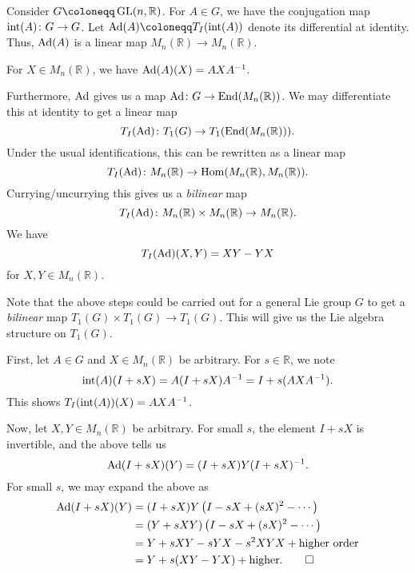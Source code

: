 \documentclass[12pt]{article}
\begin{document}
\begin{thm}
	Consider $G \coloneqq \GL(n, \mathbb{R})$. 
	For $A \in G$, we have the conjugation map $\operatorname{int}(A) \colon G \to G$. 
	Let $\Ad(A) \coloneqq T_{I}(\Int(A))$ denote its differential at identity. Thus, $\operatorname{Ad}(A)$ is a linear map $M_{n}(\mathbb{R}) \to M_{n}(\mathbb{R})$.

	For $X \in M_{n}(\mathbb{R})$, we have $\operatorname{Ad}(A)(X) = AXA^{-1}$.

	Furthermore, $\operatorname{Ad}$ gives us a map $\operatorname{Ad} \colon G \to \operatorname{End}(M_{n}(\mathbb{R}))$. We may differentiate this at identity to get a linear map
	\begin{equation*} 
		T_{I}(\operatorname{Ad}) \colon T_{1}(G) \to T_{1}(\operatorname{End}(M_{n}(\mathbb{R}))).
	\end{equation*}
	Under the usual identifications, this can be rewritten as a linear map
	\begin{equation*} 
		T_{I}(\operatorname{Ad}) \colon M_{n}(\mathbb{R}) \to \operatorname{Hom}(M_{n}(\mathbb{R}), M_{n}(\mathbb{R})).
	\end{equation*}
	Currying/uncurrying this gives us a \emph{bilinear} map
	\begin{equation*} 
		T_{I}(\operatorname{Ad}) \colon M_{n}(\mathbb{R}) \times M_{n}(\mathbb{R}) \to M_{n}(\mathbb{R}).
	\end{equation*}
	We have
	\begin{equation*} 
		T_{I}(\operatorname{Ad})(X, Y) = XY - YX
	\end{equation*}
	for $X, Y \in M_{n}(\mathbb{R})$.
\end{thm}
Note that the above steps could be carried out for a general Lie group $G$ to get a \emph{bilinear} map $T_{1}(G) \times T_{1}(G) \to T_{1}(G)$. 
This will give us the Lie algebra structure on $T_{1}(G)$.
\begin{sketch}
	First, let $A \in G$ and $X \in M_{n}(\mathbb{R})$ be arbitrary. 
	For $s \in \mathbb{R}$, we note
	\begin{equation*} 
		\operatorname{int}(A)(I + sX) = A(I + sX)A^{-1} = I + s(AXA^{-1}).
	\end{equation*}
	This shows $T_{I}(\operatorname{int}(A))(X) = AXA^{-1}$.

	Now, let $X, Y \in M_{n}(\mathbb{R})$ be arbitrary. 
	For small $s$, the element $I + sX$ is invertible, and the above tells us
	\begin{equation*} 
		\operatorname{Ad}(I + sX)(Y) = (I + sX) Y (I + sX)^{-1}.
	\end{equation*}
	For small $s$, we may expand the above as
	\begin{align*} 
		\operatorname{Ad}(I + sX)(Y) &= (I + sX) Y \left(I - sX + (sX)^{2} - \cdots \right) \\
		&= (Y + sXY) \left(I - sX + (sX)^{2} - \cdots \right) \\
		&= Y + sXY - sYX - s^{2} XYX + \text{higher order} \\
		&= Y + s(XY - YX) + \text{higher}. \qedhere
	\end{align*}
\end{sketch}
\end{document}
